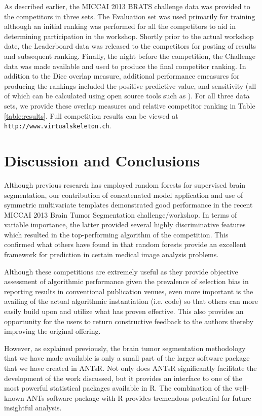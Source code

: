 \documentclass[final,5p,times,twocolumn]{elsarticle}
\begin{document}
As described earlier, the MICCAI 2013 BRATS challenge data was provided to the
competitors in three sets.  The Evaluation set was used primarily for training
although an initial ranking was performed for all the competitors to aid in
determining participation in the workshop.  Shortly prior to the actual workshop
date, the Leaderboard data was released to the competitors for posting of results
and subsequent ranking.  Finally, the night before the competition, the Challenge
data was made available and used to produce the final competitor ranking.  In addition
to the Dice overlap measure, additional performance emeasures for producing the rankings 
included the positive predictive value, and sensitivity (all of which can be calculated
using open source tools such as \cite{tustison2009}).  
For all three data sets, we provide these overlap measures and relative competitor 
ranking in Table \ref{table:results}.  Full competition results can be viewed
at {\tt http://www.virtualskeleton.ch}.

\section{Discussion and Conclusions} 

Although previous research has employed random forests for supervised brain
segmentation, our contribution of concatenated model application and use
of symmetric multivariate templates demonstrated good performance 
in the recent MICCAI 2013 Brain Tumor Segmentation challenge/workshop.  
In terms of variable importance, the latter provided several highly 
discriminative features which resulted in the top-performing algorithm 
of the competition.  This confirmed what others have found in that
random forests provide an excellent framework for prediction in certain
medical image analysis problems.



Although these competitions are extremely useful as they provide objective
assessment of algorithmic performance given the prevalence of selection bias
in reporting results in conventional publication venues, even more important
is the availing of the actual algorithmic instantiation (i.e. code) so that
others can more easily build upon and utilize what has proven effective. 
This also provides an opportunity for the users to return
constructive feedback to the authors thereby improving the original offering.  

However, as explained previously, the brain tumor segmentation 
methodology that we have made available is only a small part of the 
larger software package that we have created in ANTsR.  Not only does
ANTsR significantly facilitate the development of the work discussed,
but it provides an interface to one of the most powerful statistical
packages available in R.  The combination of the well-known ANTs software
package with R provides tremendous potential for future insightful analysis.
\end{document}

